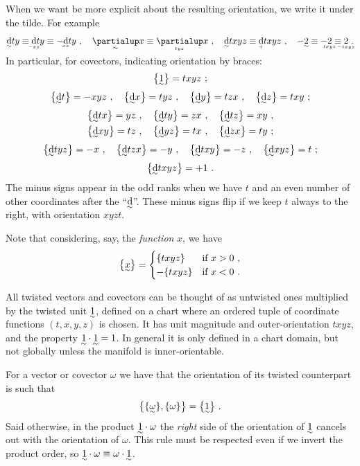 \documentclass[\ifafour a4paper,12pt,\else a5paper,10pt,\fi%
onecolumn,oneside,article,%
british%
]{memoir}
\theoremstyle{remark}
\theoremstyle{innote}
\newcommand*{\de}{\partialup}%
\newcommand*{\di}{\mathrm{d}}%
\DeclarePairedDelimiter\set{\{}{\}} %
\renewcommand*{\|}[1][]{\nonscript\:#1\vert\nonscript\:\mathopen{}}
\newcommand*{\eqn}{eq.}%
\newcommand*{\tw}[2][\scriptstyle\sim]{\smash[b]{\underset{\mathclap{{}^{#1}}}{#2}}}
\newcommand*{\ti}[1][\scriptstyle\sim]{\tw[#1]{\di}}
\newcommand*{\te}[1][\scriptstyle\sim]{\tw[#1]{\de}}
\begin{document}
When we want be more explicit about the resulting orientation, we write it under the tilde. For example
\begin{equation}
  \label{eq:examples_twisted_or}
  \ti ty \equiv \ti[-xz]ty \equiv -\ti[xz]ty \ ,\quad
  \te x \equiv \te[tyz]x \ ,\quad
  \ti txyz \equiv \ti[+]txyz\ ,\quad
  -\tw{2} \equiv -\tw[txyz]{2} \equiv \tw[-txyz]{2}\ .
\end{equation}
In particular, for covectors, indicating orientation by braces:
\begin{gather}
  \set[\big]{\tw{1}} = txyz \ ;
  \\[\jot]
  \set[\big]{\ti t} = -xyz \ , \quad
  \set[\big]{\ti x} = tyz \ , \quad
  \set[\big]{\ti y} = tzx \ , \quad
  \set[\big]{\ti z} = txy \ ;
  \\[\jot]
  \set[\big]{\ti tx} = yz \ , \quad
  \set[\big]{\ti ty} = zx \ , \quad
  \set[\big]{\ti tz} = xy \ , \\
  \set[\big]{\ti xy} = tz \ , \quad
  \set[\big]{\ti yz} = tx \ , \quad
  \set[\big]{\ti zx} = ty \ ;
  \\[\jot]
  \set[\big]{\ti tyz} = -x \ , \quad
  \set[\big]{\ti tzx} = -y \ , \quad
  \set[\big]{\ti txy} = -z \ , \quad
  \set[\big]{\ti xyz} = t \ ;
  \\[\jot]
  \set[\big]{\ti txyz} = +1 \ .
\end{gather}
The minus signs appear in the odd ranks when we have $t$ and an even number of other coordinates after the \enquote{$\ti$}. These minus signs flip if we keep $t$ always to the right, with orientation $xyzt$.

Note that considering, say, the \emph{function} $x$, we have
\begin{equation}
  \label{eq:function_t_twisted}
  \set[\big]{\tw{x}} =
  \begin{cases}
    \set{txyz} & \text{if } x>0 \ , \\
    -\set{txyz} & \text{if } x<0 \ .
  \end{cases}
\end{equation}

All twisted vectors and covectors can be thought of as untwisted ones multiplied by the twisted unit $\tw{1}$, defined on a chart where an ordered tuple of coordinate functions $(t,x,y,z)$ is chosen. It has unit magnitude and outer-orientation $txyz$, and the property $\tw{1}\cdot\tw{1}=1$. In general it is only defined in a chart domain, but not globally unless the manifold is inner-orientable.

For a vector or covector $\omega$ we have that the orientation of its twisted counterpart is such that \parencites[\eqn~(28.1)]{burke1985_r1987}
\begin{equation}
  \label{eq:orientation_twisted_cov}
  \set[\big]{\set{\tw{\omega}}, \set{\omega}} = \set[\big]{\tw{1}}\ .
\end{equation}
Said otherwise, in the product $\tw{1} \cdot \omega$ the \emph{right} side of the orientation of $\tw{1}$ cancels out with the orientation of $\omega$. This rule must be respected even if we invert the product order, so $\tw{1} \cdot \omega \equiv \omega \cdot \tw{1}$.
\end{document}
